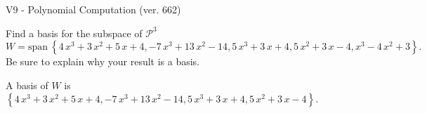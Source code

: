 \begin{exercise}
  \begin{exerciseTitle}V9 - Polynomial Computation (ver. 662)\end{exerciseTitle}
  \begin{exerciseStatement}
    Find a basis for the subspace of \(\mathcal{P}^3\) 
\[W=\mathrm{span}\ \left\{4 \, x^{3} + 3 \, x^{2} + 5 \, x + 4 , -7 \, x^{3} + 13 \, x^{2} - 14 , 5 \, x^{3} + 3 \, x + 4 , 5 \, x^{2} + 3 \, x - 4 , x^{3} - 4 \, x^{2} + 3\right\}.\]
 Be sure to explain why your result is a basis.


  \end{exerciseStatement}
  \begin{exerciseAnswer}
   A basis of \(W\) is  \(\left\{4 \, x^{3} + 3 \, x^{2} + 5 \, x + 4 , -7 \, x^{3} + 13 \, x^{2} - 14 , 5 \, x^{3} + 3 \, x + 4 , 5 \, x^{2} + 3 \, x - 4\right\}\).
  


  \end{exerciseAnswer}
\end{exercise}